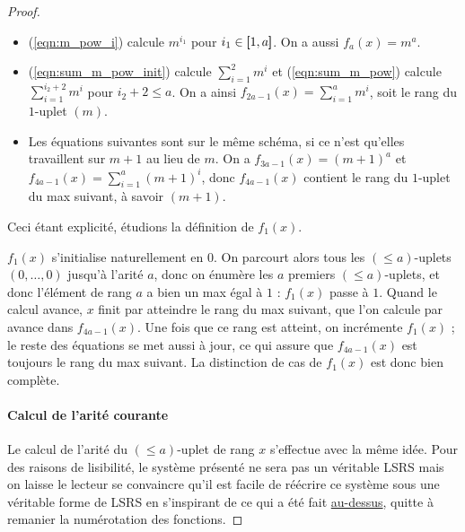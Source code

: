 \documentclass{report}
\newcommand{\leqa}{\left( \leqslant a \right)}
\begin{document}
\begin{proof}
			\begin{itemize}
				\item 	(\ref{eqn:m_pow_i}) calcule $m^{i_1}$ pour $i_1 \in \left[\!\!\>\!\left[ 1 , a \right]\!\!\>\!\right]$. On a aussi $f_{a}(x) = m^a$. 
				
				\item 	(\ref{eqn:sum_m_pow_init}) calcule $\sum_{i = 1}^{2} m^i$ et (\ref{eqn:sum_m_pow}) calcule $\sum_{i = 1}^{i_2+2} m^i$ pour $i_2+2 \leqslant a$. On a ainsi $f_{2a-1}(x) = \sum_{i = 1}^{a} m^i$, soit le rang du $1$-uplet $(m)$.
				
				\item 	Les équations suivantes sont sur le même schéma, si ce n'est qu'elles travaillent sur $m+1$ au lieu de $m$. On a $f_{3a-1}(x) = (m+1)^a$ et $f_{4a-1}(x) = \sum_{i = 1}^{a} (m+1)^i$, donc $f_{4a-1}(x)$ contient le rang du $1$-uplet du max suivant, à savoir $(m+1)$. 
			\end{itemize}
			
			Ceci étant explicité, étudions la définition de $f_1(x)$. 
			
			$f_1(x)$ s'initialise naturellement en $0$. On parcourt alors tous les $\leqa$-uplets $(0, \dots, 0)$ jusqu'à l'arité $a$, donc on énumère les $a$ premiers $\leqa$-uplets, et donc l'élément de rang $a$ a bien un max égal à $1$ : $f_1(x)$ passe à $1$. Quand le calcul avance, $x$ finit par atteindre le rang du max suivant, que l'on calcule par avance dans $f_{4a-1}(x)$. Une fois que ce rang est atteint, on incrémente $f_1(x)$ ; le reste des équations se met aussi à jour, ce qui assure que $f_{4a-1}(x)$ est toujours le rang du max suivant. La distinction de cas de $f_1(x)$ est donc bien complète.
			
		\paragraph{Calcul de l'arité courante}
			Le calcul de l'arité du $\leqa$-uplet de rang $x$ s'effectue avec la même idée. Pour des raisons de lisibilité, le système présenté ne sera pas un véritable LSRS mais on laisse le lecteur se convaincre qu'il est facile de réécrire ce système sous une véritable forme de LSRS en s'inspirant de ce qui a été fait \hyperref[par:calcul_max_bon_ordre]{au-dessus}, quitte à remanier la numérotation des fonctions. 
			

\end{proof}
\end{document}
